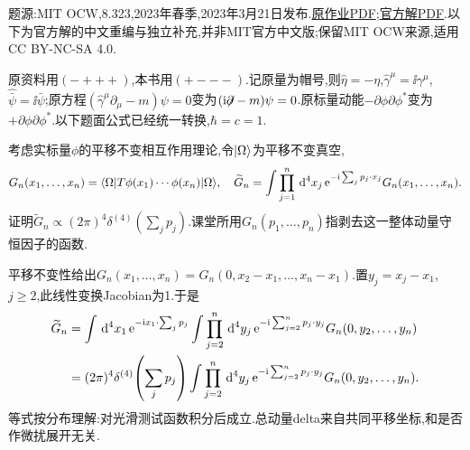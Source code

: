题源:MIT OCW,8.323,2023年春季,2023年3月21日发布.\href{https://ocw.mit.edu/courses/8-323-relativistic-quantum-field-theory-i-spring-2023/mit8_323_s23_pset07.pdf}{原作业PDF};\href{https://ocw.mit.edu/courses/8-323-relativistic-quantum-field-theory-i-spring-2023/mit8_323_s23_pset_07sol.pdf}{官方解PDF}.以下为官方解的中文重编与独立补充,并非MIT官方中文版;保留MIT OCW来源,适用CC BY-NC-SA 4.0.

原资料用$(-+++)$,本书用$(+---)$.记原量为帽号,则$\widehat\eta=-\eta$,$\widehat\gamma^\mu=\ii\gamma^\mu$,$\widehat{\bar\psi}=\ii\bar\psi$;原方程$(\widehat\gamma^\mu\partial_\mu-m)\psi=0$变为$(\mathrm i\mathord{\not\mathrel{\partial}}-m)\psi=0$.原标量动能$-\partial\phi\partial\phi^*$变为$+\partial\phi\partial\phi^*$.以下题面公式已经统一转换,$\hbar=c=1$.

\begin{exercise}
考虑实标量$\phi$的平移不变相互作用理论,令$\lvert \Omega\rangle$为平移不变真空,
\[
 G_n(x_1,\ldots,x_n)=\langle \Omega\rvert T\phi(x_1)\cdots\phi(x_n)\lvert \Omega\rangle,
 \quad \widetilde G_n=\int\prod_{j=1}^n\,\mathrm d^4x_j\,
 \mathrm e^{-\mathrm i\sum_jp_j\cdot x_j}G_n(x_1,\ldots,x_n).
\]
证明$\widetilde G_n\propto(2\pi)^4\delta^{(4)}(\sum_jp_j)$.课堂所用$G_n(p_1,\ldots,p_n)$指剥去这一整体动量守恒因子的函数.
\end{exercise}
\begin{solution}
平移不变性给出$G_n(x_1,\ldots,x_n)=G_n(0,x_2-x_1,\ldots,x_n-x_1)$.置$y_j=x_j-x_1$,$j\geq2$,此线性变换Jacobian为1.于是
\begin{align*}
 \widetilde G_n&=\int\,\mathrm d^4x_1\,\mathrm e^{-\mathrm i x_1\cdot\sum_jp_j}
 \int\prod_{j=2}^n\,\mathrm d^4y_j\,\mathrm e^{-\mathrm i\sum_{j=2}^np_j\cdot y_j}G_n(0,y_2,\ldots,y_n)\\
 &=(2\pi)^4\delta^{(4)}\!\left(\sum_jp_j\right)
 \int\prod_{j=2}^n\,\mathrm d^4y_j\,\mathrm e^{-\mathrm i\sum_{j=2}^np_j\cdot y_j}G_n(0,y_2,\ldots,y_n).
\end{align*}
等式按分布理解:对光滑测试函数积分后成立.总动量delta来自共同平移坐标,和是否作微扰展开无关.
\end{solution}

